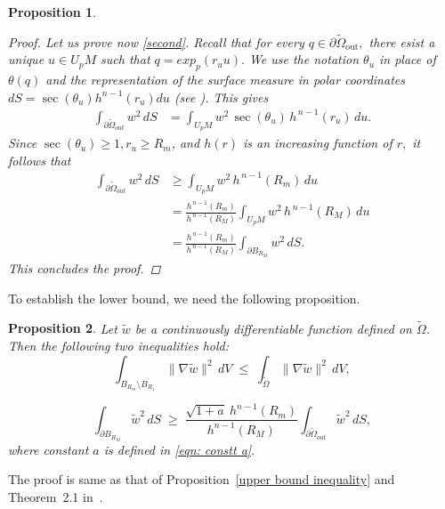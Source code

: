 \documentclass[12pt,reqno]{amsart}
\newtheorem{proposition}{Proposition}[section]
\numberwithin{equation}{section}
\numberwithin{theorem}{section}
\numberwithin{equation}{section}
\numberwithin{theorem}{section}
\begin{document}
\begin{proposition}
\begin{proof}
  Let us prove  now \eqref{second}.  Recall that for every $q\in \partial \tilde{\Omega}_\mathrm{out},$ there esist a unique $u\in U_pM$ such that $q=exp_p(r_uu).$ We use the notation $\theta_u$ in place of $\theta(q)$ and the representation of the surface 
            measure in polar coordinates $dS=\sec (\theta_u) h^{n-1}(r_u) du$ (see \cite[p.~385]{marsden1993basic}). This gives
            \begin{align*}
                \int_{\partial \tilde{\Omega}_{out}} w^2 \, dS 
                &= \int_{U_pM} w^2 \, \sec(\theta_u)\, h^{\,n-1}(r_u)\, du.
            \end{align*}
            Since $\sec(\theta_u) \geq 1, r_u \geq R_m$, and $h(r)$ is an increasing function of $r,$ it follows that
            \begin{align*}
                \int_{\partial \tilde{\Omega}_{out}} w^2 \, dS 
                &\geq \int_{U_pM} w^2 \, h^{\,n-1}(R_m)\, du \\
                &= \frac{h^{\,n-1}(R_m)}{h^{\,n-1}(R_M)} 
                \int_{U_pM} w^2 \, h^{\,n-1}(R_M)\, du \\
                &= \frac{h^{\,n-1}(R_m)}{h^{\,n-1}(R_M)} 
                \int_{\partial B_{R_M}} w^2 \, dS.
            \end{align*}
            This concludes the proof.
      
    \end{proof}
\end{proposition}

To establish the lower bound, we need the following proposition. 
\begin{proposition}\label{lower bound inequality prop}
Let $\tilde{w}$ be a continuously differentiable function defined on $\tilde{\Omega}$.
   Then the following two inequalities hold:
    \begin{equation}
        \displaystyle \int_{B_{R_m}\setminus \overline{B_{R_1}}} \|\nabla \tilde{w}\|^2 \, dV 
        \;\leq\; \int_{\tilde{\Omega}} \|\nabla \tilde{w}\|^2 \, dV, 
    \end{equation}
 
\begin{equation}
    \displaystyle \int_{\partial B_{R_M}} \tilde{w}^2 \, dS
        \;\geq\; \frac{\sqrt{1+a} \ h^{n-1}(R_m)}{h^{n-1}(R_M)} 
        \int_{\partial \tilde{\Omega}_{out}} \tilde{w}^2 \, dS,
\end{equation}
where constant $a$ is defined in \eqref{eqn: constt a}.
\end{proposition}
The proof is same as that of Proposition~\ref{upper bound inequality}  and  Theorem~2.1 in~\cite{Basak_Chorwadwala_Verma_2025}.
\end{document}

